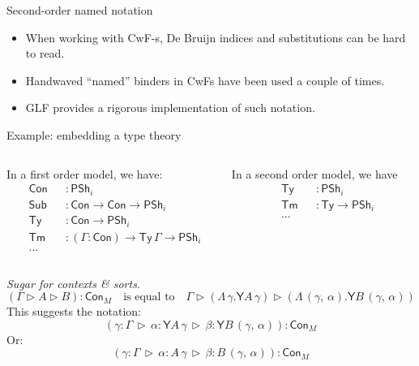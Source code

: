 \documentclass[dvipsnames,aspectratio=169]{beamer}
\newcommand{\Con}{\mathsf{Con}}
\newcommand{\Sub}{\mathsf{Sub}}
\newcommand{\Tm}{\mathsf{Tm}}
\newcommand{\Ty}{\mathsf{Ty}}
\newcommand{\Y}{\mathsf{Y}}
\newcommand{\PSh}{\mathsf{PSh}}
\newcommand{\ext}{\triangleright}
\begin{document}
\begin{frame}{Second-order named notation}
  \begin{itemize}
  \item When working with CwF-s, De Bruijn indices and substitutions
        can be hard to read.
  \item Handwaved ``named'' binders in CwFs have been used a couple of times.
  \item GLF provides a rigorous implementation of such notation.
  \end{itemize}
\end{frame}

\begin{frame}{Example: embedding a type theory}

\begin{columns}
\begin{column}{0.5\textwidth}
In a first order model, we have:
\begin{alignat*}{3}
  &\Con &&: \PSh_i \\
  &\Sub &&: \Con \to \Con \to \PSh_i \\
  &\Ty  &&: \Con \to \PSh_i \\
  &\Tm  &&: (\Gamma : \Con) \to \Ty\,\Gamma \to \PSh_i \\
  & ... &&
\end{alignat*}
\end{column}
\begin{column}{0.5\textwidth}
In a second order model, we have
\begin{alignat*}{3}
  &\Ty  &&: \PSh_i \\
  &\Tm  &&: \Ty \to \PSh_i \\
  & ... && \\
  & && \\
  & &&
\end{alignat*}
\end{column}
\end{columns}
\vspace{0.5em}
\pause

\emph{Sugar for contexts \& sorts}.
\[(\Gamma \ext A \ext B) : \Con_M \quad \text{is equal to}\quad  \Gamma \ext (\Lambda\,\gamma. \Y A\,\gamma) \ext (\Lambda\,(\gamma,\,\alpha). \Y B\,(\gamma,\,\alpha)) \]
\pause
This suggests the notation:
\[(\gamma : \Gamma\,\ext\,\alpha : \Y A\,\gamma\,\ext\,\beta : \Y B\,(\gamma,\,\alpha)) : \Con_M\]
Or:
\[(\gamma : \Gamma\,\ext\,\alpha : A\,\gamma\,\ext\,\beta : B\,(\gamma,\,\alpha)) : \Con_M\]






\end{frame}
\end{document}
